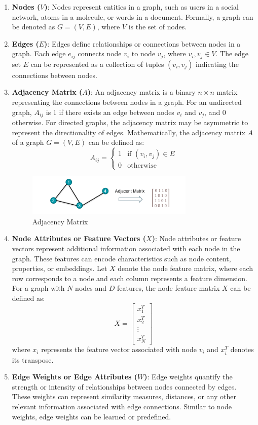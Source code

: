 \begin{enumerate}
  \item \textbf{Nodes (\(V\))}: Nodes represent entities in a graph, such as users in a social network, atoms in a molecule, or words in a document. Formally, a graph can be denoted as \( G = (V, E) \), where \( V \) is the set of nodes.
  
  \item \textbf{Edges (\(E\))}: Edges define relationships or connections between nodes in a graph. Each edge \( e_{ij} \) connects node \( v_i \) to node \( v_j \), where \( v_i, v_j \in V \). The edge set \( E \) can be represented as a collection of tuples \( (v_i, v_j) \) indicating the connections between nodes.
  
  \item \textbf{Adjacency Matrix (\(A\))}: An adjacency matrix is a binary $n \times n$ matrix representing the connections between nodes in a graph. For an undirected graph, \( A_{ij} \) is 1 if there exists an edge between nodes \( v_i \) and \( v_j \), and 0 otherwise. For directed graphs, the adjacency matrix may be asymmetric to represent the directionality of edges. Mathematically, the adjacency matrix \( A \) of a graph \( G = (V, E) \) can be defined as:
  \[
  A_{ij} = \begin{cases} 1 & \text{if } (v_i, v_j) \in E \\ 0 & \text{otherwise} \end{cases}
  \]
  \begin{figure}[ht]
    \centering
    \includegraphics[width=8cm]{images/Theory-DL/AdjMat.png}
    \caption{Adjacency Matrix}
    \label{fig:AdjMat}
\end{figure}
  \item \textbf{Node Attributes or Feature Vectors (\(X\))}: Node attributes or feature vectors represent additional information associated with each node in the graph. These features can encode characteristics such as node content, properties, or embeddings. Let \( X \) denote the node feature matrix, where each row corresponds to a node and each column represents a feature dimension. For a graph with \( N \) nodes and \( D \) features, the node feature matrix \( X \) can be defined as:
  \[
  X = \begin{bmatrix} x_1^T \\ x_2^T \\ \vdots \\ x_N^T \end{bmatrix}
  \]
  where \( x_i \) represents the feature vector associated with node \( v_i \) and \( x_i^T \) denotes its transpose.
  \item \textbf{Edge Weights or Edge Attributes (\(W\))}: Edge weights quantify the strength or intensity of relationships between nodes connected by edges. These weights can represent similarity measures, distances, or any other relevant information associated with edge connections. Similar to node weights, edge weights can be learned or predefined. 
\end{enumerate}

